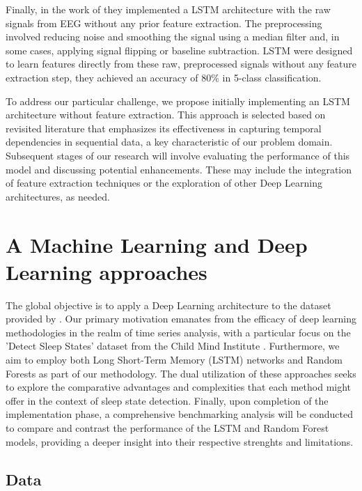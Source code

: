 \documentclass{article}
\begin{document}
Finally, in the work of \cite{Stuburic2020} they implemented a LSTM architecture with the raw signals from EEG without any prior feature extraction. The preprocessing involved reducing noise and smoothing the signal using a median filter and, in some cases, applying signal flipping or baseline subtraction. LSTM were designed to learn features directly from these raw, preprocessed signals without any feature extraction step, they achieved an accuracy of 80\% in 5-class classification.

To address our particular challenge, we propose initially implementing an LSTM architecture without feature extraction. This approach is selected based on revisited literature that emphasizes its effectiveness in capturing temporal dependencies in sequential data, a key characteristic of our problem domain. Subsequent stages of our research will involve evaluating the performance of this model and discussing potential enhancements. These may include the integration of feature extraction techniques or the exploration of other Deep Learning architectures, as needed.


\section{A Machine Learning and Deep Learning approaches}

The global objective is to apply a Deep Learning architecture to the dataset provided by \cite{child-mind-institute-detect-sleep-states}. Our primary motivation emanates from the efficacy of deep learning methodologies in the realm of time series analysis, with a particular focus on the 'Detect Sleep States' dataset from the Child Mind Institute \cite{child-mind-institute-detect-sleep-states}. Furthermore, we aim to employ both Long Short-Term Memory (LSTM) networks and Random Forests as part of our methodology. The dual utilization of these approaches seeks to explore the comparative advantages and complexities that each method might offer in the context of sleep state detection. Finally, upon completion of the implementation phase, a comprehensive benchmarking analysis will be conducted to compare and contrast the performance of the LSTM and Random Forest models, providing a deeper insight into their respective strenghts and limitations.


\subsection{Data}
\end{document}

